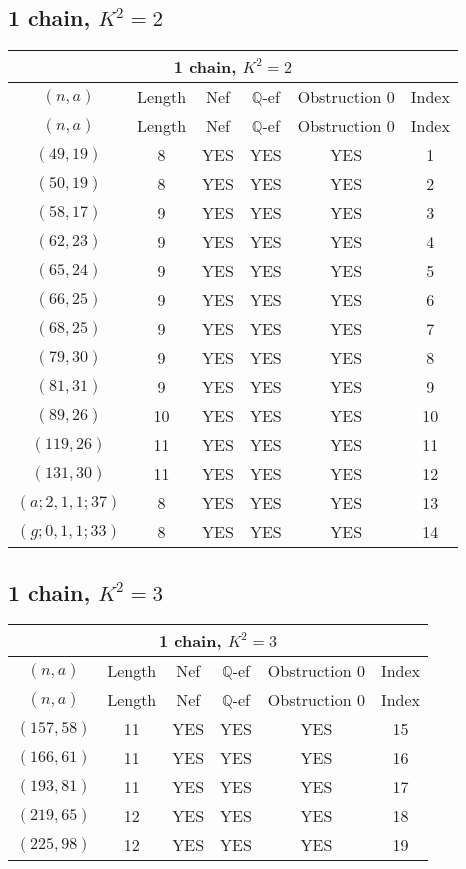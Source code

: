 \subsection{1 chain, $K^2 = 2$}
\begin{longtable}{|c|c|c|c|c|c|}
\hline
\multicolumn{6}{|c|}{1 chain, $K^2 = 2$}\\
\hline
$(n,a)$ & Length & Nef & $\mathbb Q$-ef & Obstruction 0 & Index\\
\hline
\endfirsthead

\hline
$(n,a)$ & Length & Nef & $\mathbb Q$-ef & Obstruction 0 & Index\\
\hline
\endhead
\hline
\endfoot

$(49, 19)$ & 8 & YES & YES & YES & 1\\
$(50, 19)$ & 8 & YES & YES & YES & 2\\
$(58, 17)$ & 9 & YES & YES & YES & 3\\
$(62, 23)$ & 9 & YES & YES & YES & 4\\
$(65, 24)$ & 9 & YES & YES & YES & 5\\
$(66, 25)$ & 9 & YES & YES & YES & 6\\
$(68, 25)$ & 9 & YES & YES & YES & 7\\
$(79, 30)$ & 9 & YES & YES & YES & 8\\
$(81, 31)$ & 9 & YES & YES & YES & 9\\
$(89, 26)$ & 10 & YES & YES & YES & 10\\
$(119, 26)$ & 11 & YES & YES & YES & 11\\
$(131, 30)$ & 11 & YES & YES & YES & 12\\
$(a; 2, 1, 1; 37)$ & 8 & YES & YES & YES & 13\\
$(g; 0, 1, 1; 33)$ & 8 & YES & YES & YES & 14
\end{longtable}
\subsection{1 chain, $K^2 = 3$}
\begin{longtable}{|c|c|c|c|c|c|}
\hline
\multicolumn{6}{|c|}{1 chain, $K^2 = 3$}\\
\hline
$(n,a)$ & Length & Nef & $\mathbb Q$-ef & Obstruction 0 & Index\\
\hline
\endfirsthead

\hline
$(n,a)$ & Length & Nef & $\mathbb Q$-ef & Obstruction 0 & Index\\
\hline
\endhead
\hline
\endfoot

$(157, 58)$ & 11 & YES & YES & YES & 15\\
$(166, 61)$ & 11 & YES & YES & YES & 16\\
$(193, 81)$ & 11 & YES & YES & YES & 17\\
$(219, 65)$ & 12 & YES & YES & YES & 18\\
$(225, 98)$ & 12 & YES & YES & YES & 19
\end{longtable}
